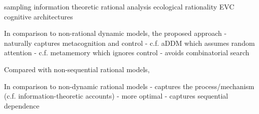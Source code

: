 sampling
information theoretic
rational analysis
ecological rationality
EVC
cognitive architectures




In comparison to non-rational dynamic models, the proposed approach
- naturally captures metacognition and control
  - c.f. aDDM which assumes random attention
  - c.f. metamemory which ignores control
- avoids combinatorial search

Compared with non-sequential rational models, 











In comparison to non-dynamic rational models
- captures the process/mechanism (c.f. information-theoretic accounts)
- more optimal
- captures sequential dependence



